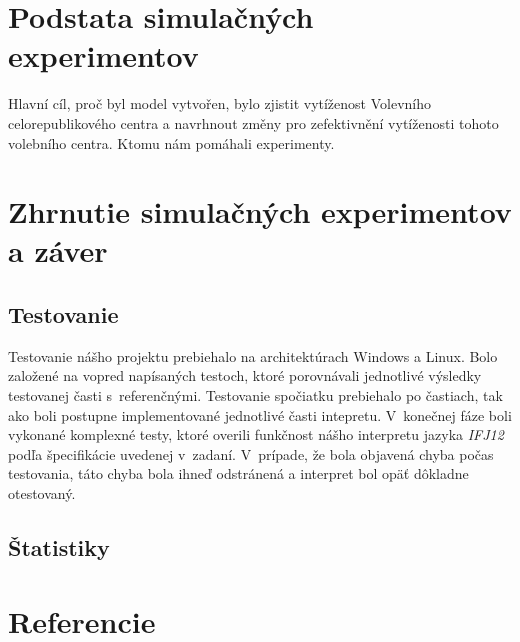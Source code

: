 \documentclass[12pt,a4paper,titlepage,final]{article}
\begin{document}
\newpage


\section{Podstata simulačných experimentov}
Hlavní cíl, proč byl model vytvořen, bylo zjistit vytíženost Volevního celorepublikového centra a navrhnout změny pro zefektivnění vytíženosti tohoto volebního centra. Ktomu nám pomáhali experimenty. 

\section{Zhrnutie simulačných experimentov a záver}

\subsection{Testovanie}
Testovanie nášho projektu prebiehalo na architektúrach Windows a Linux. Bolo založené na vopred napísaných testoch, ktoré porovnávali jednotlivé výsledky testovanej časti s~referenčnými. Testovanie spočiatku prebiehalo po častiach, tak ako boli postupne implementované jednotlivé časti intepretu.
V~konečnej fáze boli vykonané komplexné testy, ktoré overili funkčnost nášho interpretu jazyka \emph{IFJ12} podľa špecifikácie uvedenej v~zadaní. V~prípade, že bola objavená chyba počas testovania, táto chyba bola ihneď odstránená a interpret bol opäť dôkladne otestovaný.


\subsection{Štatistiky}
\newpage


 
\newpage




\newpage

\section{Referencie}





\newpage
\end{document}
